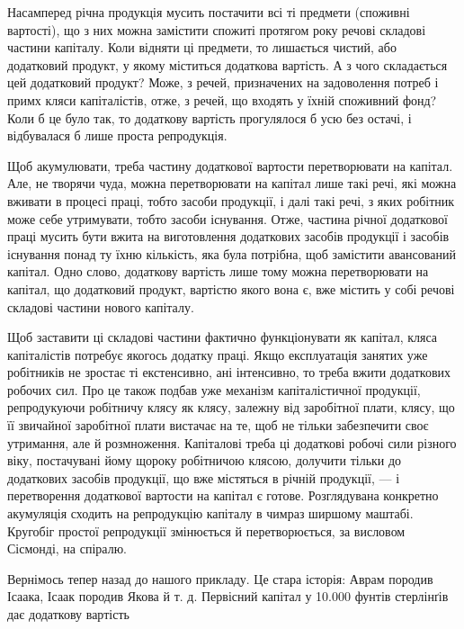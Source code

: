 Насамперед річна продукція мусить постачити всі ті предмети
(споживні вартості), що з них можна замістити спожиті
протягом року речові складові частини капіталу. Коли відняти
ці предмети, то лишається чистий, або додатковий продукт, у
якому міститься додаткова вартість. А з чого складається цей
додатковий продукт? Може, з речей, призначених на задоволення
потреб і примх кляси капіталістів, отже, з речей, що входять
у їхній споживний фонд? Коли б це було так, то додаткову
вартість прогулялося б усю без остачі, і відбувалася б лише
проста репродукція.

Щоб акумулювати, треба частину додаткової вартости перетворювати
на капітал. Але, не творячи чуда, можна перетворювати
на капітал лише такі речі, які можна вживати в процесі
праці, тобто засоби продукції, і далі такі речі, з яких робітник
може себе утримувати, тобто засоби існування. Отже, частина
річної додаткової праці мусить бути вжита на виготовлення додаткових
засобів продукції і засобів існування понад ту їхню
кількість, яка була потрібна, щоб замістити авансований капітал.
Одно слово, додаткову вартість лише тому можна перетворювати
на капітал, що додатковий продукт, вартістю якого вона
є, вже містить у собі речові складові частини нового капіталу.

Щоб заставити ці складові частини фактично функціонувати
як капітал, кляса капіталістів потребує якогось додатку праці.
Якщо експлуатація занятих уже робітників не зростає ті екстенсивно,
ані інтенсивно, то треба вжити додаткових робочих сил.
Про це також подбав уже механізм капіталістичної продукції,
репродукуючи робітничу клясу як клясу, залежну від заробітної
плати, клясу, що її звичайної заробітної плати вистачає на
те, щоб не тільки забезпечити своє утримання, але й розмноження.
Капіталові треба ці додаткові робочі сили різного віку, постачувані
йому щороку робітничою клясою, долучити тільки до
додаткових засобів продукції, що вже містяться в річній продукції,
— і перетворення додаткової вартости на капітал є готове.
Розглядувана конкретно акумуляція сходить на репродукцію
капіталу в чимраз ширшому маштабі. Кругобіг простої репродукції
змінюється й перетворюється, за висловом Сісмонді, на
спіралю.

Вернімось тепер назад до нашого прикладу. Це стара історія:
Аврам породив Ісаака, Ісаак породив Якова й т. д. Первісний
капітал у 10.000 фунтів стерлінґів дає додаткову вартість
\parbreak{}  %
